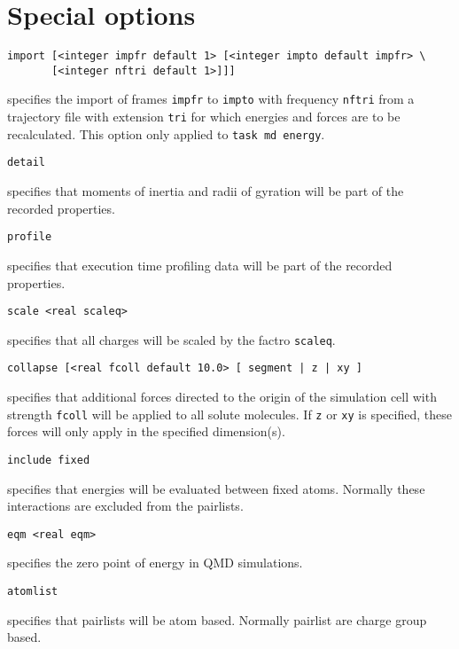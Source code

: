 \section{Special options}
\begin{description}

\item 
\begin{verbatim}
import [<integer impfr default 1> [<integer impto default impfr> \
       [<integer nftri default 1>]]]
\end{verbatim}
specifies the import of frames \verb+impfr+ to \verb+impto+ with 
frequency \verb+nftri+ from a trajectory file with extension
\verb+tri+ for which energies and forces are to be recalculated.
This option only applied to \verb+task md energy+.

\item 
\begin{verbatim}
detail
\end{verbatim}
specifies that moments of inertia and radii of gyration will be part of the
recorded properties.

\item 
\begin{verbatim}
profile
\end{verbatim}
specifies that execution time profiling data will be part of the
recorded properties.

\item 
\begin{verbatim}
scale <real scaleq>
\end{verbatim}
specifies that all charges will be scaled by the factro \verb+scaleq+.

\item 
\begin{verbatim}
collapse [<real fcoll default 10.0> [ segment | z | xy ]
\end{verbatim}
specifies that additional forces directed to the origin of the
simulation cell with strength \verb+fcoll+ will be 
applied to all solute molecules. If \verb+z+ or \verb+xy+ is
specified, these forces will only apply in the specified dimension(s).


\item 
\begin{verbatim}
include fixed
\end{verbatim}
specifies that energies will be evaluated between fixed atoms.
Normally these interactions are excluded from the pairlists.


\item 
\begin{verbatim}
eqm <real eqm>
\end{verbatim}
specifies the zero point of energy in QMD simulations.

\item 
\begin{verbatim}
atomlist
\end{verbatim}
specifies that pairlists will be atom based. Normally pairlist
are charge group based.

\end{description}


